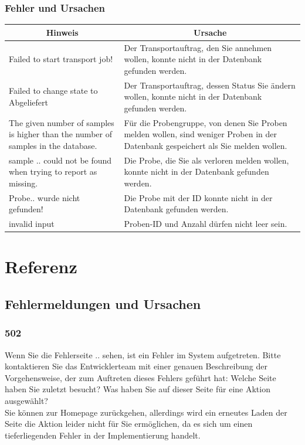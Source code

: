 \documentclass[enabledeprecatedfontcommands,fontsize=12pt,paper=a4,twoside]{scrartcl}
\begin{document}
\subsubsection{Fehler und Ursachen}
\begin{longtable}[c]{|p{5cm}|p{10cm}|}
\hline
\multicolumn{1}{|c|}{\textbf{Hinweis}}                          & \multicolumn{1}{c|}{\textbf{Ursache}}                                                                                                                                                                                                               \\ \hline
\endhead
Failed to start transport job! & Der Transportauftrag, den Sie annehmen wollen, konnte nicht in der Datenbank gefunden werden. \\ \hline
Failed to change state to Abgeliefert & Der Transportauftrag, dessen Status Sie ändern wollen, konnte nicht in der Datenbank gefunden werden.\\ \hline
The given number of samples is higher than the number of samples in the database. &  Für die Probengruppe, von denen Sie Proben melden wollen, sind weniger Proben in der Datenbank gespeichert als Sie melden wollen. \\ \hline
sample .. could not be found when trying to report as missing. & Die Probe, die Sie als verloren melden wollen, konnte nicht in der Datenbank gefunden werden. \\ \hline
Probe.. wurde nicht gefunden! & Die Probe mit der ID konnte nicht in der Datenbank gefunden werden. \\ \hline
invalid input& Proben-ID und Anzahl dürfen nicht leer sein. \\ \hline
\end{longtable}

\newpage
\section{Referenz}
\subsection{Fehlermeldungen und Ursachen}
\subsubsection{502}
Wenn Sie die Fehlerseite .. sehen, ist ein Fehler im System aufgetreten. Bitte kontaktieren Sie das Entwicklerteam mit einer genauen Beschreibung der Vorgehensweise, der zum Auftreten dieses Fehlers geführt hat: Welche Seite haben Sie zuletzt besucht? Was haben Sie auf dieser Seite für eine Aktion ausgewählt? \\
Sie können zur Homepage zurückgehen, allerdings wird ein erneutes Laden der Seite die Aktion leider nicht für Sie ermöglichen, da es sich um einen tieferliegenden Fehler in der Implementierung handelt. \\
\end{document}
